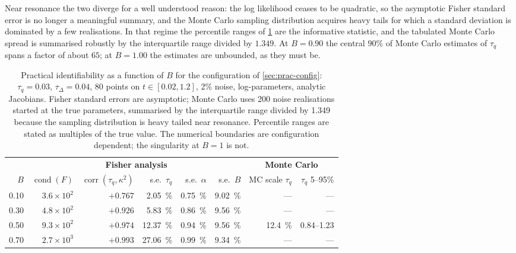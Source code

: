 \documentclass[preprint,12pt,a4paper]{elsarticle}
\theoremstyle{plain}
\theoremstyle{definition}
\theoremstyle{remark}
\newcommand{\tq}{\tau_{q}}
\newcommand{\kk}{\kappa^{2}}
\newcommand{\Bnum}{B}
\begin{document}
Near resonance the two diverge for a well understood reason: the log likelihood
ceases to be quadratic, so the asymptotic Fisher standard error is no longer a
meaningful summary, and the Monte Carlo sampling distribution acquires heavy
tails for which a standard deviation is dominated by a few realisations. In
that regime the percentile ranges of \cref{tab:identifiability} are the
informative statistic, and the tabulated Monte Carlo spread is summarised robustly by the
interquartile range divided by $1.349$. At $\Bnum = 0.90$ the central $90\%$ of
Monte Carlo estimates of $\tq$ spans a factor of about $65$; at
$\Bnum = 1.00$ the estimates are unbounded, as they must be.
\begin{table}[htbp]
  \centering
  \caption{Practical identifiability as a function of $\Bnum$ for the
           configuration of \cref{sec:prac-config}: $\tq=0.03$,
           $\tau_{\Delta}=0.04$, 80 points on $t\in[0.02,1.2]$, 2\% noise,
           log-parameters, analytic Jacobians. Fisher standard errors are
           asymptotic; Monte Carlo uses 200 noise realisations started at the
           true parameters, summarised by the interquartile range divided by
           1.349 because the sampling distribution is heavy tailed near
           resonance. Percentile ranges are stated as multiples of the
           true value. The numerical boundaries are configuration dependent;
           the singularity at $\Bnum=1$ is not.}
  \label{tab:identifiability}
  \scriptsize
  \begin{tabular}{@{}rrrrrrrr@{}}
    \toprule
    & \multicolumn{5}{c}{\textbf{Fisher analysis}}
    & \multicolumn{2}{c}{\textbf{Monte Carlo}} \\
    \cmidrule(lr){2-6}\cmidrule(lr){7-8}
   $\Bnum$ & $\operatorname{cond}(F)$ & $\operatorname{corr}(\tq,\kk)$ &
s.e.\ $\tq$ & s.e.\ $\alpha$ & s.e.\ $\Bnum$ &
MC scale $\tq$ & $\tq$ 5--95\% \\
    \midrule
    0.10 & $3.6\times10^{2}$  & $+0.767$ & \SI{2.05}{\percent}  & \SI{0.75}{\percent} & \SI{9.02}{\percent} & --- & --- \\
    0.30 & $4.8\times10^{2}$  & $+0.926$ & \SI{5.83}{\percent}  & \SI{0.86}{\percent} & \SI{9.56}{\percent} & --- & --- \\
    0.50 & $9.3\times10^{2}$  & $+0.974$ & \SI{12.37}{\percent} & \SI{0.94}{\percent} & \SI{9.56}{\percent} & \SI{12.4}{\percent} & 0.84--1.23 \\
    0.70 & $2.7\times10^{3}$  & $+0.993$ & \SI{27.06}{\percent} & \SI{0.99}{\percent} & \SI{9.34}{\percent} & --- & --- \\

\end{tabular}
\end{table}
\end{document}
